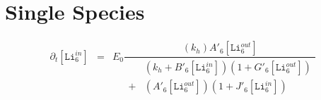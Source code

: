 \documentclass[aps,onecolumn,11pt]{revtex4}
\newcommand{\mychem}[1]{\mathtt{#1}}
\newcommand{\myconc}[1]{\left\lbrack{#1}\right\rbrack}
\newcommand{\LiIn}[1]{\myconc{\mychem{Li}_{#1}^{in}}}
\newcommand{\LiOut}[1]{\myconc{\mychem{Li}_{#1}^{out}}}
\begin{document}
\section{Single Species}

\begin{equation}
	\begin{array}{rcl}
	\partial_t \LiIn{6} & = & E_0 
	\dfrac{
	\left(k_h \right) A'_6 \LiOut{6} 
	 }
	{
	\begin{array}{cl}
	&\left(k_h + B'_6 \LiIn{6} \right) \left(1 + G'_6 \LiOut{6} \right)\\
	+&\left(A'_6 \LiOut{6}\right)\left(1 + J'_6 \LiIn{6}\right)\\
	\end{array}
	}\\
	\end{array}
\end{equation}	
\end{document}
